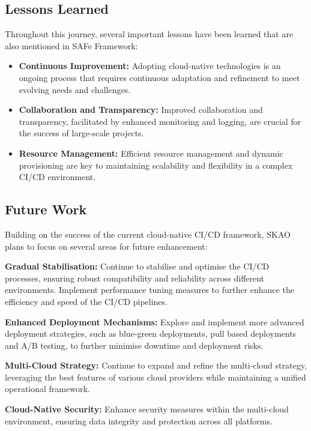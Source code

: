 \documentclass[a4paper]{spie}  %
\begin{document}
\subsection{Lessons Learned}

Throughout this journey, several important lessons have been learned that are also mentioned in SAFe Framework\cite{safe}:

\begin{itemize}
    \item \textbf{Continuous Improvement:} Adopting cloud-native technologies is an ongoing process that requires continuous adaptation and refinement to meet evolving needs and challenges.
    \item \textbf{Collaboration and Transparency:} Improved collaboration and transparency, facilitated by enhanced monitoring and logging, are crucial for the success of large-scale projects.
    \item \textbf{Resource Management:} Efficient resource management and dynamic provisioning are key to maintaining scalability and flexibility in a complex CI/CD environment.
\end{itemize}

\subsection{Future Work}

Building on the success of the current cloud-native CI/CD framework, SKAO plans to focus on several areas for future enhancement:

\textbf{Gradual Stabilisation:} Continue to stabilise and optimise the CI/CD processes, ensuring robust compatibility and reliability across different environments. Implement performance tuning measures to further enhance the efficiency and speed of the CI/CD pipelines.

\textbf{Enhanced Deployment Mechanisms:} Explore and implement more advanced deployment strategies, such as blue-green deployments, pull based deployments and A/B testing, to further minimise downtime and deployment risks.

\textbf{Multi-Cloud Strategy:} Continue to expand and refine the multi-cloud strategy, leveraging the best features of various cloud providers while maintaining a unified operational framework.

\textbf{Cloud-Native Security:} Enhance security measures within the multi-cloud environment, ensuring data integrity and protection across all platforms.
\end{document}
